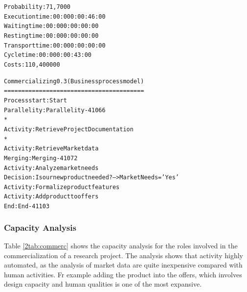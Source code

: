 \begin{alltt}
Probability:   71,7000%
Execution time:  00:000:00:46:00
Waiting time:  00:000:00:00:00
Resting time:  00:000:00:00:00
Transport time:  00:000:00:00:00
Cycle time:  00:000:00:43:00
Costs:  110,400000

Commercializing 0.3 (Business process model)
========================================
Process start: Start
Parallelity: Parallelity-41066
    *
    Activity: Retrieve Project Documentation
    *
    Activity: Retrieve Market data
Merging: Merging-41072
Activity: Analyze market needs
Decision: Is our new product needed? --> MarketNeeds = 'Yes'
Activity: Formalize product features
Activity: Add product to offers
End: End-41103
\end{alltt}



\subsubsection{Capacity Analysis}
Table \ref{2tab:commerc} shows the capacity analysis for the roles involved in
the commercialization of a research project.
The analysis shows that activity highly automated, as the analysis of
market data are quite inexpensive compared with human activities. Fr
example adding the product into the offers, which involves design capacity
and human qualities is one of the most expansive.

